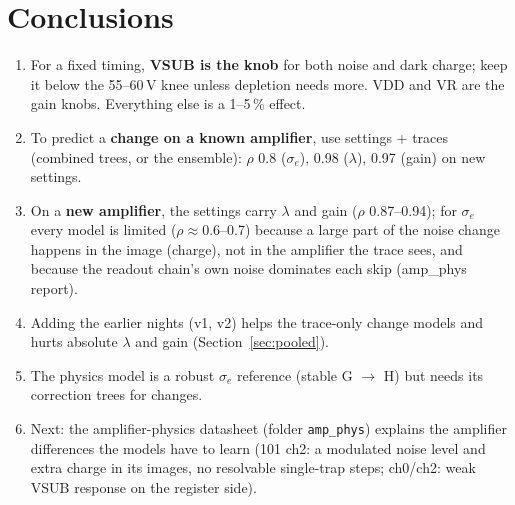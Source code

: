 \documentclass[11pt]{article}
\begin{document}
\section{Conclusions}
\begin{enumerate}
\item For a fixed timing, \textbf{VSUB is the knob} for both noise and dark charge; keep it below the 55--60\,V knee
  unless depletion needs more. VDD and VR are the gain knobs. Everything else is a 1--5\,\% effect.
\item To predict a \textbf{change on a known amplifier}, use settings + traces (combined trees, or the ensemble): $\rho$
  0.8 ($\sigma_e$), 0.98 ($\lambda$), 0.97 (gain) on new settings.
\item On a \textbf{new amplifier}, the settings carry $\lambda$ and gain ($\rho$ 0.87--0.94); for $\sigma_e$ every
  model is limited ($\rho\approx0.6$--0.7) because a large part of the noise change happens in the image (charge), not in
  the amplifier the trace sees, and because the readout chain's own noise dominates each skip (amp\_phys report).
\item Adding the earlier nights (v1, v2) helps the trace-only change models and hurts absolute $\lambda$ and gain
  (Section~\ref{sec:pooled}).
\item The physics model is a robust $\sigma_e$ reference (stable G $\to$ H) but needs its correction trees for changes.
\item Next: the amplifier-physics datasheet (folder \texttt{amp\_phys}) explains the amplifier differences the models
  have to learn (101 ch2: a modulated noise level and extra charge in its images, no resolvable single-trap steps;
  ch0/ch2: weak VSUB response on the register side).
\end{enumerate}


\appendix
\end{document}
